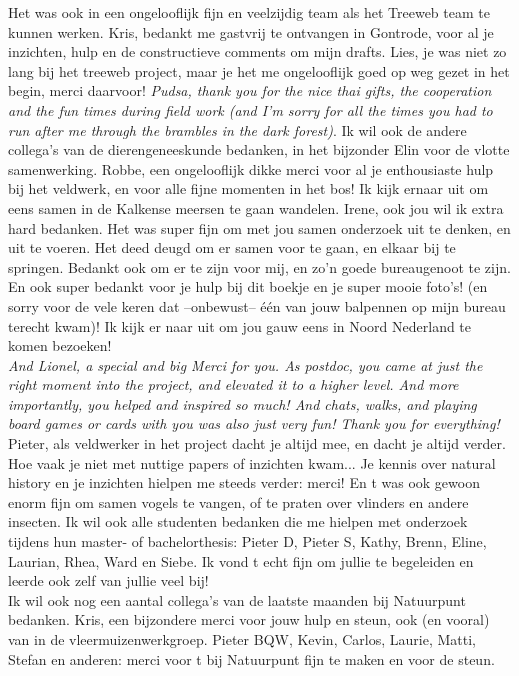 \documentclass[10pt, twoside]{book} %
\begin{document}
Het was ook in een ongelooflijk fijn en veelzijdig team als het Treeweb team te kunnen werken. Kris, bedankt me gastvrij te ontvangen in Gontrode, voor al je inzichten, hulp en de constructieve comments om mijn drafts. Lies, je was niet zo lang bij het treeweb project, maar je het me ongelooflijk goed op weg gezet in het begin, merci daarvoor! \textit{Pudsa, thank you for the nice thai gifts, the cooperation and the fun times during field work (and I'm sorry for all the times you had to run after me through the brambles in the dark forest)}. Ik wil ook de andere collega's van de dierengeneeskunde bedanken, in het bijzonder Elin voor de vlotte samenwerking. Robbe, een ongelooflijk dikke merci voor al je enthousiaste hulp bij het veldwerk, en voor alle fijne momenten in het bos! Ik kijk ernaar uit om eens samen in de Kalkense meersen te gaan wandelen. Irene, ook jou wil ik extra hard bedanken. Het was super fijn om met jou samen onderzoek uit te denken, en uit te voeren. Het deed deugd om er samen voor te gaan, en elkaar bij te springen. Bedankt ook om er te zijn voor mij, en zo'n goede bureaugenoot te zijn. En ook super bedankt voor je hulp bij dit boekje en je super mooie foto's! (en sorry voor de vele keren dat --onbewust--  \'{e}\'{e}n van jouw balpennen op mijn bureau terecht kwam)! Ik kijk er naar uit om jou gauw eens in Noord Nederland te komen bezoeken!\\

\textit{And Lionel, a special and big Merci for you. As postdoc, you came at just the right moment into the project, and elevated it to a higher level. And more importantly, you helped and inspired so much! And chats, walks, and playing board games or cards with you was also just very fun! Thank you for everything!} Pieter, als veldwerker in het project dacht je altijd mee, en dacht je altijd verder. Hoe vaak je niet met nuttige papers of inzichten kwam... Je kennis over natural history en je inzichten hielpen me steeds verder: merci! En t was ook gewoon enorm fijn om samen vogels te vangen, of te praten over vlinders en andere insecten. Ik wil ook alle studenten bedanken die me hielpen met onderzoek tijdens hun master- of bachelorthesis: Pieter D, Pieter S, Kathy, Brenn, Eline, Laurian, Rhea, Ward en Siebe. Ik vond t echt fijn om jullie te begeleiden en leerde ook zelf van jullie veel bij!\\

Ik wil ook nog een aantal collega's van de laatste maanden bij Natuurpunt bedanken. Kris, een bijzondere merci voor jouw hulp en steun, ook (en vooral) van in de vleermuizenwerkgroep. Pieter BQW, Kevin, Carlos, Laurie, Matti, Stefan en anderen: merci voor t bij Natuurpunt fijn te maken en voor de steun.\\
\end{document}
